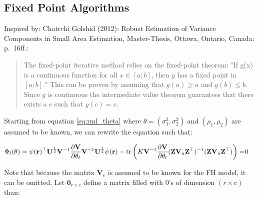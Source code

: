 \subsection{Fixed Point Algorithms}\label{fixed-point-algorithms}

Inspired by: Chatrchi Golshid (2012): Robust Estimation of Variance
Components in Small Area Estimation, Master-Thesis, Ottawa, Ontario,
Canada: p.~16ff.:

\begin{quote}
The fixed-point iterative method relies on the fixed-point theorem:
"If g(x) is a continuous function for all $x \in [a; b]$, then $g$ has a fixed
point in $[a; b]$." This can be proven by assuming that $g(a)\geq a$ and
$g(b)\leq b$. Since $g$ is continuous the intermediate value theorem guarantees
that there exists a $c$ such that $g(c) = c$.
\end{quote}

Starting from equation \ref{eq:rml_theta} where
$\theta = (\sigma_1^2, \sigma_2^2)$ and $(\rho_1, \rho_2)$ are assumed
to be known, we can rewrite the equation such that:

\begin{align}
\label{eq:rml_theta_fp}
\Phi_l(\theta) = \psi(\mathbf{r})^\top\mathbf{U}^{\frac{1}{2}}\mathbf{V}^{-1}\frac{\partial\mathbf{V}}{\partial\theta_l}\mathbf{V}^{-1}\mathbf{U}^{\frac{1}{2}} \psi(\mathbf{r}) - \operatorname{tr}\left(K\mathbf{V}^{-1}\frac{\partial\mathbf{V}}{\partial\theta_l} (\mathbf{Z}\mathbf{V}_u\mathbf{Z}^\top)^{-1} (\mathbf{Z}\mathbf{V}_u\mathbf{Z}^\top)\right) =& 0
\end{align}

Note that because the matrix $\mathbf{V}_e$ is assumed to be known for
the FH model, it can be omitted. Let $\mathbf{0}_{r\times c}$ define a
matrix filled with 0's of dimension $(r \times c)$ than:


